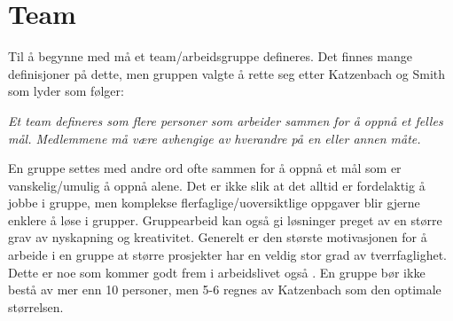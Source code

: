\section{Team}
Til å begynne med må et team/arbeidsgruppe defineres. 
Det finnes mange definisjoner på dette, men gruppen valgte å rette seg etter Katzenbach og Smith som lyder som følger: 

\begin{center}
\textit{Et team defineres som flere personer som arbeider sammen for å oppnå et felles mål. \newline
Medlemmene må være avhengige av hverandre på en eller annen måte.}
\newline 
\citep{katzenbach}
\end{center}

En gruppe settes med andre ord ofte sammen for å oppnå et mål som er vanskelig/umulig å oppnå alene. 
Det er ikke slik at det alltid er fordelaktig å jobbe i gruppe, men komplekse flerfaglige/uoversiktlige oppgaver blir gjerne enklere å løse i grupper.
Gruppearbeid kan også gi løsninger preget av en større grav av nyskapning og kreativitet. 
Generelt er den største motivasjonen for å arbeide i en gruppe at større prosjekter har en veldig stor grad av tverrfaglighet. 
Dette er noe som kommer godt frem i arbeidslivet også \citep{levin}. 
En gruppe bør ikke bestå av mer enn 10 personer, men 5-6 regnes av Katzenbach som den optimale størrelsen.
